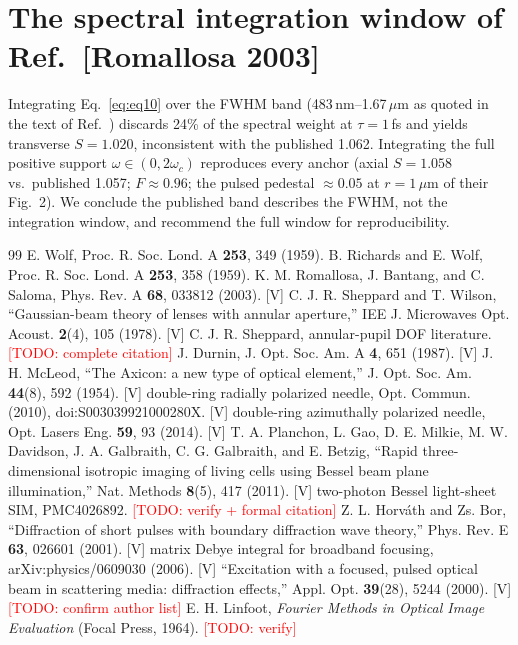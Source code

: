 \documentclass[11pt]{article}
\newcommand{\todo}[1]{\textcolor{red}{[TODO: #1]}}
\begin{document}
\appendix
\section{The spectral integration window of Ref.~[Romallosa 2003]}
\label{app:window}
Integrating Eq.~\eqref{eq:eq10} over the FWHM band
(483\,nm--1.67\,$\mu$m as quoted in the text of Ref.~\cite{Romallosa2003})
discards 24\% of the spectral weight at $\tau=1$\,fs and yields transverse
$S=1.020$, inconsistent with the published 1.062. Integrating the full
positive support $\omega\in(0,2\omega_c)$ reproduces every anchor (axial
$S=1.058$ vs.\ published 1.057; $F\approx0.96$; the pulsed pedestal
${\approx}0.05$ at $r=1\,\mu$m of their Fig.~2). We conclude the published
band describes the FWHM, not the integration window, and recommend the full
window for reproducibility.

\begin{thebibliography}{99}\small
{} E. Wolf, Proc. R. Soc. Lond. A \textbf{253}, 349 (1959).
 B. Richards and E. Wolf, Proc. R. Soc. Lond. A
\textbf{253}, 358 (1959).
 K. M. Romallosa, J. Bantang, and C. Saloma, Phys. Rev.
A \textbf{68}, 033812 (2003). [V]
 C. J. R. Sheppard and T. Wilson, ``Gaussian-beam
theory of lenses with annular aperture,'' IEE J. Microwaves Opt. Acoust.
\textbf{2}(4), 105 (1978). [V]
 C. J. R. Sheppard, annular-pupil DOF literature.
\todo{complete citation}
 J. Durnin, J. Opt. Soc. Am. A \textbf{4}, 651 (1987). [V]
 J. H. McLeod, ``The Axicon: a new type of optical
element,'' J. Opt. Soc. Am. \textbf{44}(8), 592 (1954). [V]
 double-ring radially polarized needle, Opt. Commun.
(2010), doi:S003039921000280X. [V]
 double-ring azimuthally polarized needle, Opt. Lasers
Eng. \textbf{59}, 93 (2014). [V]
 T. A. Planchon, L. Gao, D. E. Milkie, M. W.
Davidson, J. A. Galbraith, C. G. Galbraith, and E. Betzig, ``Rapid
three-dimensional isotropic imaging of living cells using Bessel beam plane
illumination,'' Nat. Methods \textbf{8}(5), 417 (2011). [V]
 two-photon Bessel light-sheet SIM, PMC4026892.
\todo{verify + formal citation}
 Z. L. Horv\'ath and Zs. Bor, ``Diffraction of short
pulses with boundary diffraction wave theory,'' Phys. Rev. E \textbf{63},
026601 (2001). [V]
 matrix Debye integral for broadband focusing,
arXiv:physics/0609030 (2006). [V]
 ``Excitation with a focused, pulsed optical
beam in scattering media: diffraction effects,'' Appl. Opt. \textbf{39}(28),
5244 (2000). [V] \todo{confirm author list}
 E. H. Linfoot, \emph{Fourier Methods in Optical Image
Evaluation} (Focal Press, 1964). \todo{verify}
\end{thebibliography}
\end{document}
